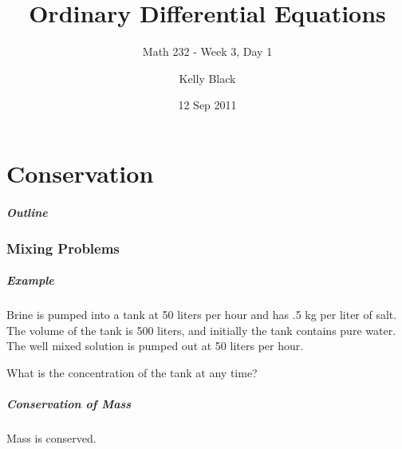 \part{Conservation}


\title{Ordinary Differential Equations}
\subtitle{Math 232 - Week 3, Day 1}

\author{Kelly Black}
\date{12 Sep 2011}

\begin{frame}
  \titlepage
\end{frame}

\begin{frame}
  \frametitle{Outline}
\end{frame}


\section{Mixing Problems}


\begin{frame}
  \frametitle{Example}

  Brine is pumped into a tank at 50 liters per hour and has .5 kg per
  liter of salt. The volume of the tank is 500 liters, and initially
  the tank contains pure water. The well mixed solution is pumped out
  at 50 liters per hour.

  What is the concentration of the tank at any time?

\end{frame}


\begin{frame}
  \frametitle{Conservation of Mass}

  Mass is conserved.



\end{frame}


